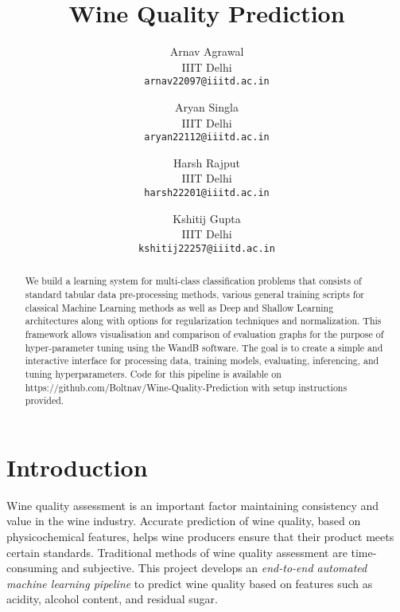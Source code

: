 \documentclass[10pt,twocolumn,letterpaper]{article}
\begin{document}
\title{Wine Quality Prediction}

\author{
Arnav Agrawal\\
IIIT Delhi\\
{\tt\small arnav22097@iiitd.ac.in}
\and
Aryan Singla\\
IIIT Delhi\\
{\tt\small aryan22112@iiitd.ac.in}
\and
Harsh Rajput\\
IIIT Delhi\\
{\tt\small harsh22201@iiitd.ac.in}
\and
Kshitij Gupta\\
IIIT Delhi\\
{\tt\small kshitij22257@iiitd.ac.in}
}

\maketitle


\begin{abstract}
We build a learning system for multi-class classification problems that consists of standard tabular data pre-processing methods, various general training scripts for classical Machine Learning methods as well as Deep and Shallow Learning architectures along with options for regularization techniques and normalization. This framework allows visualisation and comparison of evaluation graphs for the purpose of hyper-parameter tuning using the WandB software. The goal is to create a simple and interactive interface for processing data, training models, evaluating, inferencing, and tuning hyperparameters. Code for this pipeline is available on https://github.com/Boltnav/Wine-Quality-Prediction with setup instructions provided.
\end{abstract}

\section{Introduction}
Wine quality assessment is an important factor maintaining consistency and value in the wine industry. Accurate prediction of wine quality, based on physicochemical features, helps wine producers ensure that their product meets certain standards. Traditional methods of wine quality assessment are time-consuming and subjective. This project develops an \textit{end-to-end automated machine learning pipeline} to predict wine quality based on features such as acidity, alcohol content, and residual sugar.
\end{document}
